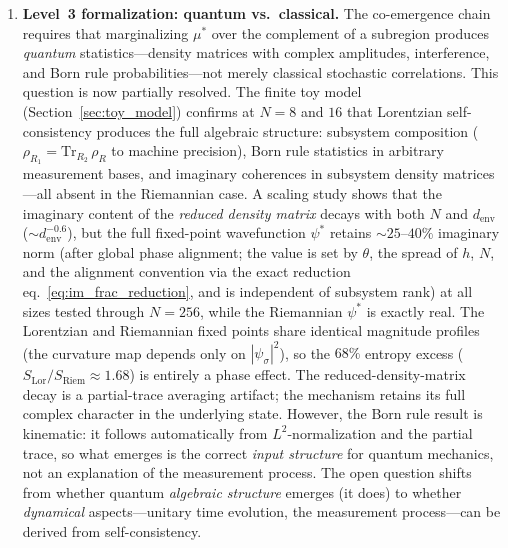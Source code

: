 \documentclass[12pt,a4paper]{article}
\theoremstyle{definition}
\theoremstyle{remark}
\begin{document}
\begin{enumerate}
\item \textbf{Level~3 formalization: quantum vs.\ classical.}
The co-emergence chain requires that marginalizing $\mu^*$ over the
complement of a subregion produces \emph{quantum} statistics---density
matrices with complex amplitudes, interference, and Born rule
probabilities---not merely classical stochastic correlations. This
question is now partially resolved. The finite toy model
(Section~\ref{sec:toy_model}) confirms at $N = 8$ and $16$ that
Lorentzian self-consistency produces the full algebraic structure:
subsystem composition ($\rho_{R_1} = \mathrm{Tr}_{R_2}\,\rho_R$ to
machine precision), Born rule statistics in arbitrary measurement bases,
and imaginary coherences in subsystem density matrices---all absent in
the Riemannian case.
A scaling study shows that the imaginary content of the
\emph{reduced density matrix} decays with both $N$ and $d_{\mathrm{env}}$
($\sim d_{\mathrm{env}}^{-0.6}$), but the full fixed-point wavefunction
$\psi^*$ retains $\sim 25$--$40\%$ imaginary norm (after global phase
alignment; the value is set by $\theta$, the spread of $h$, $N$, and the
alignment convention via the exact reduction
eq.~\eqref{eq:im_frac_reduction}, and is independent of subsystem rank)
at all sizes tested through $N = 256$, while the Riemannian $\psi^*$ is
exactly real. The
Lorentzian and Riemannian fixed points share identical magnitude
profiles (the curvature map depends only on $|\psi_\sigma|^2$), so the
$68\%$ entropy excess
($S_{\mathrm{Lor}}/S_{\mathrm{Riem}} \approx 1.68$) is entirely a
phase effect. The reduced-density-matrix decay is a partial-trace
averaging artifact; the mechanism retains its full complex character
in the underlying state. However, the Born rule
result is kinematic: it follows
automatically from $L^2$-normalization and the partial trace, so what
emerges is the correct \emph{input structure} for quantum mechanics, not
an explanation of the measurement process. The open question shifts from
whether quantum \emph{algebraic structure} emerges (it does) to whether
\emph{dynamical} aspects---unitary time evolution, the measurement
process---can be derived from self-consistency.


\end{enumerate}
\end{document}
